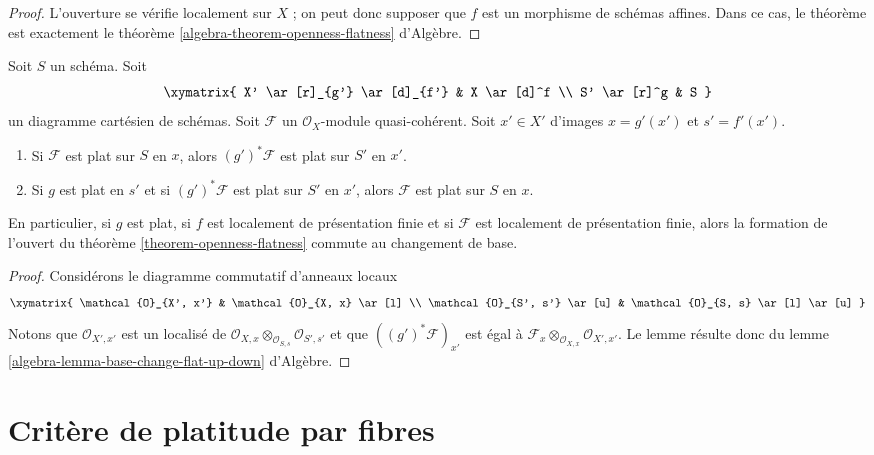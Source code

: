 \begin{proof}
L'ouverture se vérifie localement sur $X$ ; on peut donc supposer
que $f$ est un morphisme de schémas affines. Dans ce cas, le
théorème est exactement le
théorème \ref{algebra-theorem-openness-flatness} d'Algèbre.
\end{proof}

\begin{lemma}
\label{lemma-flat-locus-base-change}
Soit $S$ un schéma.
Soit
$$
\xymatrix{
X' \ar[r]_{g'} \ar[d]_{f'} & X \ar[d]^f \\
S' \ar[r]^g & S
}
$$
un diagramme cartésien de schémas.
Soit $\mathcal{F}$ un $\mathcal{O}_X$-module quasi-cohérent.
Soit $x' \in X'$ d'images
$x = g'(x')$ et $s' = f'(x')$.
\begin{enumerate}
\item Si $\mathcal{F}$ est plat sur $S$ en $x$, alors
$(g')^*\mathcal{F}$ est plat sur $S'$ en $x'$.
\item Si $g$ est plat en $s'$ et si $(g')^*\mathcal{F}$ est plat sur $S'$ en
$x'$, alors $\mathcal{F}$ est plat sur $S$ en $x$.
\end{enumerate}
En particulier, si $g$ est plat, si $f$ est localement de présentation finie
et si $\mathcal{F}$ est localement de présentation finie,
alors la formation de l'ouvert du
théorème \ref{theorem-openness-flatness}
commute au changement de base.
\end{lemma}

\begin{proof}
Considérons le diagramme commutatif d'anneaux locaux
$$
\xymatrix{
\mathcal{O}_{X', x'} & \mathcal{O}_{X, x} \ar[l] \\
\mathcal{O}_{S', s'} \ar[u] & \mathcal{O}_{S, s} \ar[l] \ar[u]
}
$$
Notons que $\mathcal{O}_{X', x'}$
est un localisé de
$\mathcal{O}_{X, x} \otimes_{\mathcal{O}_{S, s}} \mathcal{O}_{S', s'}$
et que $((g')^*\mathcal{F})_{x'}$ est égal à
$\mathcal{F}_x \otimes_{\mathcal{O}_{X, x}} \mathcal{O}_{X', x'}$.
Le lemme résulte donc du
lemme \ref{algebra-lemma-base-change-flat-up-down} d'Algèbre.
\end{proof}






\section{Critère de platitude par fibres}
\label{section-criterion-flat-fibres}

